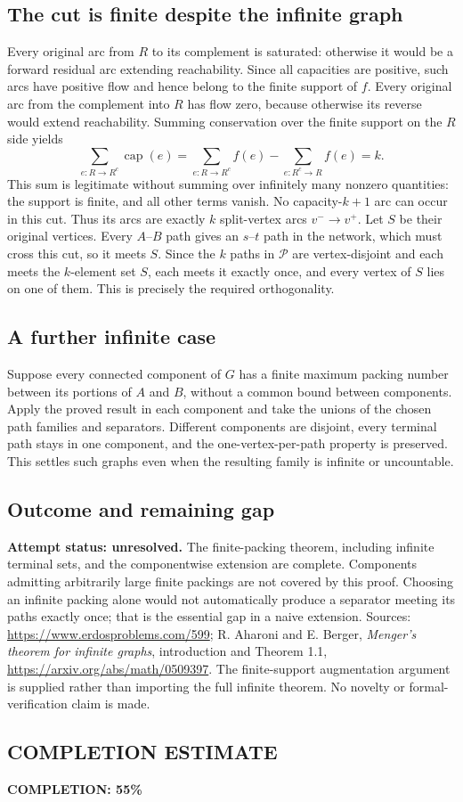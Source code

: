 \subsection*{The cut is finite despite the infinite graph}
Every original arc from $R$ to its complement is saturated: otherwise it would be a forward residual arc extending reachability. Since all capacities are positive, such arcs have positive flow and hence belong to the finite support of $f$. Every original arc from the complement into $R$ has flow zero, because otherwise its reverse would extend reachability.
Summing conservation over the finite support on the $R$ side yields
\[\sum_{e:R\to R^c}\operatorname{cap}(e)
=\sum_{e:R\to R^c}f(e)-\sum_{e:R^c\to R}f(e)=k.\tag{1}\]
This sum is legitimate without summing over infinitely many nonzero quantities: the support is finite, and all other terms vanish. No capacity-$k+1$ arc can occur in this cut. Thus its arcs are exactly $k$ split-vertex arcs $v^-\to v^+$.
Let $S$ be their original vertices. Every $A$--$B$ path gives an $s$--$t$ path in the network, which must cross this cut, so it meets $S$. Since the $k$ paths in $\mathcal P$ are vertex-disjoint and each meets the $k$-element set $S$, each meets it exactly once, and every vertex of $S$ lies on one of them. This is precisely the required orthogonality.

\subsection*{A further infinite case}
Suppose every connected component of $G$ has a finite maximum packing number between its portions of $A$ and $B$, without a common bound between components. Apply the proved result in each component and take the unions of the chosen path families and separators. Different components are disjoint, every terminal path stays in one component, and the one-vertex-per-path property is preserved. This settles such graphs even when the resulting family is infinite or uncountable.

\subsection*{Outcome and remaining gap}
\textbf{Attempt status: unresolved.} The finite-packing theorem, including infinite terminal sets, and the componentwise extension are complete. Components admitting arbitrarily large finite packings are not covered by this proof. Choosing an infinite packing alone would not automatically produce a separator meeting its paths exactly once; that is the essential gap in a naive extension.
Sources: \url{https://www.erdosproblems.com/599}; R. Aharoni and E. Berger, \emph{Menger's theorem for infinite graphs}, introduction and Theorem 1.1, \url{https://arxiv.org/abs/math/0509397}. The finite-support augmentation argument is supplied rather than importing the full infinite theorem. No novelty or formal-verification claim is made.

\subsection*{COMPLETION ESTIMATE}
\textbf{COMPLETION: 55\%}
